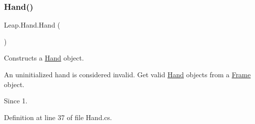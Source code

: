 \subsubsection{\texorpdfstring{Hand()}{Hand()}\hspace{0.1cm}{\footnotesize\ttfamily [1/2]}}
{\footnotesize\ttfamily Leap.\+Hand.\+Hand (\begin{DoxyParamCaption}{ }\end{DoxyParamCaption})}



Constructs a \mbox{\hyperlink{class_leap_1_1_hand}{Hand}} object. 

An uninitialized hand is considered invalid. Get valid \mbox{\hyperlink{class_leap_1_1_hand}{Hand}} objects from a \mbox{\hyperlink{class_leap_1_1_frame}{Frame}} object.

\begin{DoxySince}{Since}
1. 
\end{DoxySince}


Definition at line 37 of file Hand.\+cs.

\mbox{\label{class_leap_1_1_hand_a22d968c711ec019c96b5626a174f470e}} 
